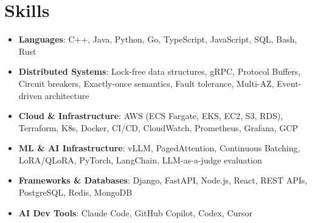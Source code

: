 \documentclass[letterpaper,11pt]{article}
\newcommand{\resumeSubHeadingListStart}{\begin{itemize}[leftmargin=0.15in, label={}]}
\newcommand{\resumeSubHeadingListEnd}{\end{itemize}}
\newcommand{\resumeSkillHeading}[2]{%
  \item\small{\textbf{#1}: #2 \vspace{-9pt}}%
}
\begin{document}
\section{Skills}
  \resumeSubHeadingListStart
    \resumeSkillHeading{Languages}{C++, Java, Python, Go, TypeScript, JavaScript, SQL, Bash, Rust}
    \resumeSkillHeading{Distributed Systems}{Lock-free data structures, gRPC, Protocol Buffers, Circuit breakers, Exactly-once semantics, Fault tolerance, Multi-AZ, Event-driven architecture}
    \resumeSkillHeading{Cloud \& Infrastructure}{AWS (ECS Fargate, EKS, EC2, S3, RDS), Terraform, K8s, Docker, CI/CD, CloudWatch, Prometheus, Grafana, GCP}
    \resumeSkillHeading{ML \& AI Infrastructure}{vLLM, PagedAttention, Continuous Batching, LoRA/QLoRA, PyTorch, LangChain, LLM-as-a-judge evaluation}
    \resumeSkillHeading{Frameworks \& Databases}{Django, FastAPI, Node.js, React, REST APIs, PostgreSQL, Redis, MongoDB}
    \resumeSkillHeading{AI Dev Tools}{Claude Code, GitHub Copilot, Codex, Cursor}
  \resumeSubHeadingListEnd
\end{document}
